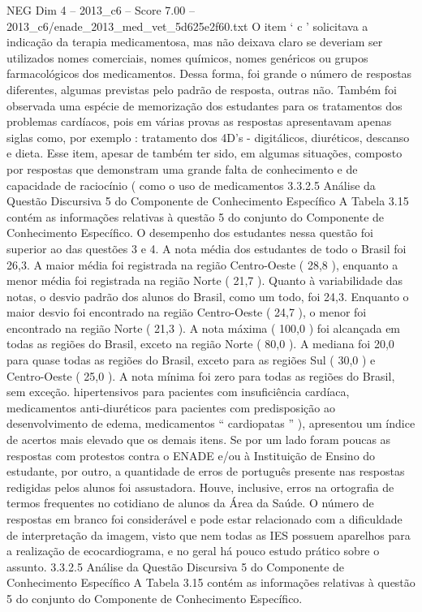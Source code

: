 \begin{textsample}{NEG Dim 4 – 2013\_c6 – Score 7.00 – 2013\_c6/enade\_2013\_med\_vet\_5d625e2f60.txt}
O item ‘ c ’ solicitava a indicação da terapia medicamentosa, mas não deixava claro se deveriam ser utilizados nomes comerciais, nomes químicos, nomes genéricos ou grupos farmacológicos dos medicamentos.
Dessa forma, foi grande o número de respostas diferentes, algumas previstas pelo padrão de resposta, outras não.
Também foi observada uma espécie de memorização dos estudantes para os tratamentos dos problemas cardíacos, pois em várias provas as respostas apresentavam apenas siglas como, por exemplo : tratamento dos 4D’s - digitálicos, diuréticos, descanso e dieta.
Esse item, apesar de também ter sido, em algumas situações, composto por respostas que demonstram uma grande falta de conhecimento e de capacidade de raciocínio ( como o uso de medicamentos 3.3.2.5 Análise da Questão Discursiva 5 do Componente de Conhecimento Específico A Tabela 3.15 contém as informações relativas à questão 5 do conjunto do Componente de Conhecimento Específico.
O desempenho dos estudantes nessa questão foi superior ao das questões 3 e 4.
A nota média dos estudantes de todo o Brasil foi 26,3.
A maior média foi registrada na região Centro-Oeste ( 28,8 ), enquanto a menor média foi registrada na região Norte ( 21,7 ).
Quanto à variabilidade das notas, o desvio padrão dos alunos do Brasil, como um todo, foi 24,3.
Enquanto o maior desvio foi encontrado na região Centro-Oeste ( 24,7 ), o menor foi encontrado na região Norte ( 21,3 ).
A nota máxima ( 100,0 ) foi alcançada em todas as regiões do Brasil, exceto na região Norte ( 80,0 ).
A mediana foi 20,0 para quase todas as regiões do Brasil, exceto para as regiões Sul ( 30,0 ) e Centro-Oeste ( 25,0 ).
A nota mínima foi zero para todas as regiões do Brasil, sem exceção. hipertensivos para pacientes com insuficiência cardíaca, medicamentos anti-diuréticos para pacientes com predisposição ao desenvolvimento de edema, medicamentos “ cardiopatas ” ), apresentou um índice de acertos mais elevado que os demais itens.
Se por um lado foram poucas as respostas com protestos contra o ENADE e/ou à Instituição de Ensino do estudante, por outro, a quantidade de erros de português presente nas respostas redigidas pelos alunos foi assustadora.
Houve, inclusive, erros na ortografia de termos frequentes no cotidiano de alunos da Área da Saúde.
O número de respostas em branco foi considerável e pode estar relacionado com a dificuldade de interpretação da imagem, visto que nem todas as IES possuem aparelhos para a realização de ecocardiograma, e no geral há pouco estudo prático sobre o assunto. 3.3.2.5 Análise da Questão Discursiva 5 do Componente de Conhecimento Específico A Tabela 3.15 contém as informações relativas à questão 5 do conjunto do Componente de Conhecimento Específico.

\end{textsample}
